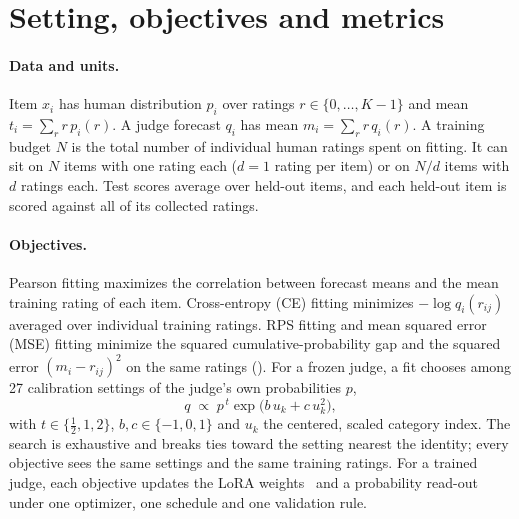 \section{Setting, objectives and metrics}
\label{sec:setting}

\paragraph{Data and units.}
Item $x_i$ has human distribution $p_i$ over ratings $r\in\{0,\dots,K-1\}$ and mean $t_i=\sum_r r\,p_i(r)$.
A judge forecast $q_i$ has mean $m_i=\sum_r r\,q_i(r)$.
A training budget $N$ is the total number of individual human ratings spent on fitting.
It can sit on $N$ items with one rating each ($d=1$ rating per item) or on $N/d$ items with $d$ ratings each.
Test scores average over held-out items, and each held-out item is scored against all of its collected ratings.

\paragraph{Objectives.}
Pearson fitting maximizes the correlation between forecast means and the mean training rating of each item.
Cross-entropy (CE) fitting minimizes $-\log q_i(r_{ij})$ averaged over individual training ratings.
RPS fitting and mean squared error (MSE) fitting minimize the squared cumulative-probability gap and the squared error $(m_i-r_{ij})^2$ on the same ratings ().
For a frozen judge, a fit chooses among 27 calibration settings of the judge's own probabilities $p$,
\begin{equation}
q\;\propto\;p^{\,t}\exp\!\bigl(b\,u_k+c\,u_k^{2}\bigr),
\label{eq:head}
\end{equation}
with $t\in\{\tfrac12,1,2\}$, $b,c\in\{-1,0,1\}$ and $u_k$ the centered, scaled category index.
The search is exhaustive and breaks ties toward the setting nearest the identity; every objective sees the same settings and the same training ratings.
For a trained judge, each objective updates the LoRA weights~\citep{hu2022lora} and a probability read-out under one optimizer, one schedule and one validation rule.

